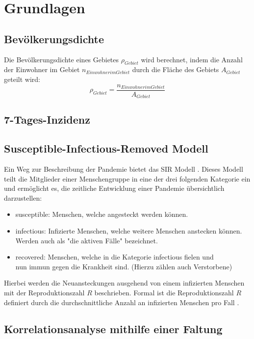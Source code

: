 \chapter{Grundlagen}\label{chap:Grundlagen}
\section{Bevölkerungsdichte}
Die Bevölkerungsdichte eines Gebietes $\rho_{Gebiet}$ wird berechnet, indem die Anzahl der Einwohner im Gebiet $n_{Einwohner im Gebiet}$ durch die Fläche des Gebiets $A_{Gebiet}$ geteilt wird:
\begin{equation}
    \rho_{Gebiet} = \frac{n_{Einwohner im Gebiet}}{A_{Gebiet}}
\end{equation}
\section{7-Tages-Inzidenz}
\section{Susceptible-Infectious-Removed Modell}
Ein Weg zur Beschreibung der Pandemie bietet das SIR Modell \autocite{SIR}. Dieses Modell teilt die Mitglieder einer Menschengruppe in eine der drei folgenden Kategorie ein und ermöglicht es, die zeitliche Entwicklung einer Pandemie übersichtlich darzustellen:
\begin{itemize}
    \item \glqq{}susceptible\grqq{}: Menschen, welche angesteckt werden können.
    \item \glqq{}infectious\grqq{}: Infizierte Menschen, welche weitere Menschen anstecken können. Werden auch als "die aktiven Fälle" bezeichnet.
    \item \glqq{}recovered\grqq{}: Menschen, welche in die Kategorie \glqq{}infectious\grqq{} fielen und\\
    nun immun gegen die Krankheit sind. (Hierzu zählen auch Verstorbene)
\end{itemize}
Hierbei werden die Neuansteckungen ausgehend von einem infizierten Menschen mit der Reproduktionszahl $R$ beschrieben. Formal ist die Reproduktionszahl $R$ definiert durch die durchschnittliche Anzahl an infizierten Menschen pro Fall \autocite{ReZahl}.


\section{Korrelationsanalyse mithilfe einer Faltung}\label{sec:BeschreibungKorrelationsanalyse}

